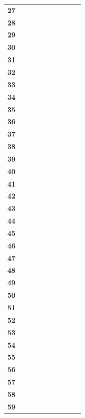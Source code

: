 \documentclass{l4proj}
\begin{document}
\begin{appendices}
\begin{table}[!ht]
\begin{tabular}{@{}l|llllll@{}}
        \textbf{27} & ~ & ~ & ~ & ~ & ~ & ~ \\ 
        \textbf{28} & ~ & ~ & ~ & ~ & ~ & ~ \\ 
        \textbf{29} & ~ & ~ & ~ & ~ & ~ & ~ \\ 
        \textbf{30} & ~ & ~ & ~ & ~ & ~ & ~ \\ 
        \textbf{31} & ~ & ~ & ~ & ~ & ~ & ~ \\ 
        \textbf{32} & ~ & ~ & ~ & ~ & ~ & ~ \\ 
        \textbf{33} & ~ & ~ & ~ & ~ & ~ & ~ \\ 
        \textbf{34} & ~ & ~ & ~ & ~ & ~ & ~ \\ 
        \textbf{35} & ~ & ~ & ~ & ~ & ~ & ~ \\ 
        \textbf{36} & ~ & ~ & ~ & ~ & ~ & ~ \\ 
        \textbf{37} & ~ & ~ & ~ & ~ & ~ & ~ \\ 
        \textbf{38} & ~ & ~ & ~ & ~ & ~ & ~ \\ 
        \textbf{39} & ~ & ~ & ~ & ~ & ~ & ~ \\ 
        \textbf{40} & ~ & ~ & ~ & ~ & ~ & ~ \\ 
        \textbf{41} & ~ & ~ & ~ & ~ & ~ & ~ \\ 
        \textbf{42} & ~ & ~ & ~ & ~ & ~ & ~ \\ 
        \textbf{43} & ~ & ~ & ~ & ~ & ~ & ~ \\ 
        \textbf{44} & ~ & ~ & ~ & ~ & ~ & ~ \\ 
        \textbf{45} & ~ & ~ & ~ & ~ & ~ & ~ \\ 
        \textbf{46} & ~ & ~ & ~ & ~ & ~ & ~ \\ 
        \textbf{47} & ~ & ~ & ~ & ~ & ~ & ~ \\ 
        \textbf{48} & ~ & ~ & ~ & ~ & ~ & ~ \\ 
        \textbf{49} & ~ & ~ & ~ & ~ & ~ & ~ \\ 
        \textbf{50} & ~ & ~ & ~ & ~ & ~ & ~ \\ 
        \textbf{51} & ~ & ~ & ~ & ~ & ~ & ~ \\ 
        \textbf{52} & ~ & ~ & ~ & ~ & ~ & ~ \\ 
        \textbf{53} & ~ & ~ & ~ & ~ & ~ & ~ \\ 
        \textbf{54} & ~ & ~ & ~ & ~ & ~ & ~ \\ 
        \textbf{55} & ~ & ~ & ~ & ~ & ~ & ~ \\ 
        \textbf{56} & ~ & ~ & ~ & ~ & ~ & ~ \\ 
        \textbf{57} & ~ & ~ & ~ & ~ & ~ & ~ \\ 
        \textbf{58} & ~ & ~ & ~ & ~ & ~ & ~ \\ 
        \textbf{59} & ~ & ~ & ~ & ~ & ~ & ~ \\ 
    \end{tabular}
\end{table}

\end{appendices}
\end{document}

